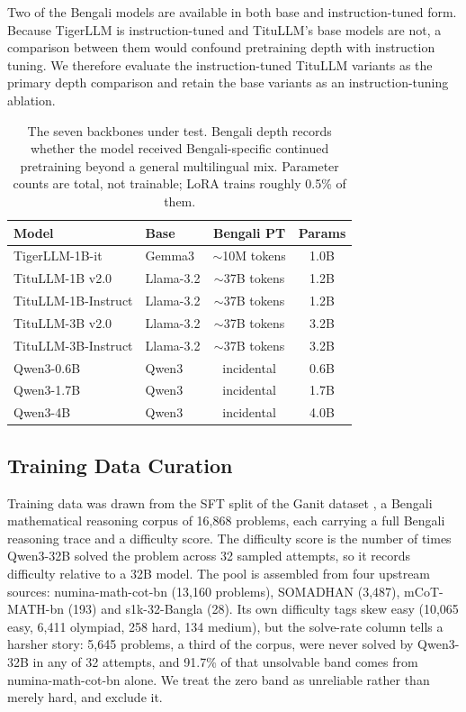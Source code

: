 \documentclass[10pt,twocolumn,letterpaper]{article}
\begin{document}
Two of the Bengali models are available in both base and instruction-tuned
form. Because TigerLLM is instruction-tuned and TituLLM's base models are not, a
comparison between them would confound pretraining depth with instruction
tuning. We therefore evaluate the instruction-tuned TituLLM variants as the
primary depth comparison and retain the base variants as an instruction-tuning
ablation.

\begin{table}[htbp]
\caption{The seven backbones under test. Bengali depth records whether the model received Bengali-specific continued pretraining beyond a general multilingual mix. Parameter counts are total, not trainable; LoRA trains roughly 0.5\% of them.}
\label{tab:models}
\centering
\begin{tabular}{|l|l|c|c|}
\hline
\textbf{Model} & \textbf{Base} & \textbf{Bengali PT} & \textbf{Params} \\
\hline
TigerLLM-1B-it        & Gemma3      & $\sim$10M tokens & 1.0B \\
TituLLM-1B v2.0       & Llama-3.2   & $\sim$37B tokens & 1.2B \\
TituLLM-1B-Instruct   & Llama-3.2   & $\sim$37B tokens & 1.2B \\
TituLLM-3B v2.0       & Llama-3.2   & $\sim$37B tokens & 3.2B \\
TituLLM-3B-Instruct   & Llama-3.2   & $\sim$37B tokens & 3.2B \\
Qwen3-0.6B            & Qwen3       & incidental       & 0.6B \\
Qwen3-1.7B            & Qwen3       & incidental       & 1.7B \\
Qwen3-4B              & Qwen3       & incidental       & 4.0B \\
\hline
\end{tabular}
\end{table}

\subsection{Training Data Curation}

Training data was drawn from the SFT split of the Ganit dataset
\parencite{ganitllm}, a Bengali mathematical reasoning corpus of 16,868
problems, each carrying a full Bengali reasoning trace and a difficulty score.
The difficulty score is the number of times Qwen3-32B solved the problem across
32 sampled attempts, so it records difficulty relative to a 32B model. The pool
is assembled from four upstream sources: numina-math-cot-bn (13,160 problems),
SOMADHAN (3,487), mCoT-MATH-bn (193) and s1k-32-Bangla (28). Its own difficulty
tags skew easy (10,065 easy, 6,411 olympiad, 258 hard, 134 medium), but the
solve-rate column tells a harsher story: 5,645 problems, a third of the corpus,
were never solved by Qwen3-32B in any of 32 attempts, and 91.7\% of that
unsolvable band comes from numina-math-cot-bn alone. We treat the zero band as
unreliable rather than merely hard, and exclude it.
\end{document}
